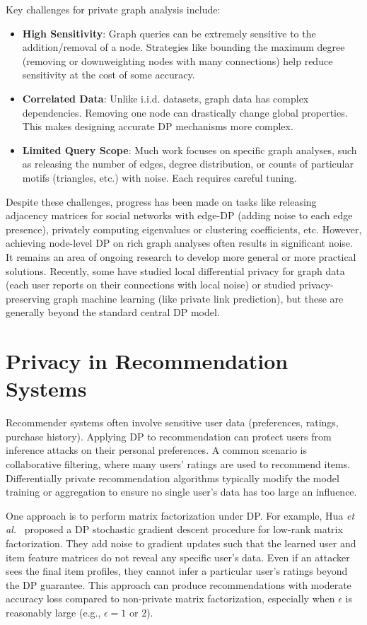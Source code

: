 \documentclass[11pt]{article}
\theoremstyle{remark}
\theoremstyle{definition}
\theoremstyle{plain}
\begin{document}
Key challenges for private graph analysis include:
\begin{itemize}
    \item \textbf{High Sensitivity}: Graph queries can be extremely sensitive to the addition/removal of a node. Strategies like bounding the maximum degree (removing or downweighting nodes with many connections) help reduce sensitivity at the cost of some accuracy.
    \item \textbf{Correlated Data}: Unlike i.i.d. datasets, graph data has complex dependencies. Removing one node can drastically change global properties. This makes designing accurate DP mechanisms more complex.
    \item \textbf{Limited Query Scope}: Much work focuses on specific graph analyses, such as releasing the number of edges, degree distribution, or counts of particular motifs (triangles, etc.) with noise. Each requires careful tuning.
\end{itemize}

Despite these challenges, progress has been made on tasks like releasing adjacency matrices for social networks with edge-DP (adding noise to each edge presence), privately computing eigenvalues or clustering coefficients, etc. However, achieving node-level DP on rich graph analyses often results in significant noise. It remains an area of ongoing research to develop more general or more practical solutions. Recently, some have studied local differential privacy for graph data (each user reports on their connections with local noise) or studied privacy-preserving graph machine learning (like private link prediction), but these are generally beyond the standard central DP model.

\section{Privacy in Recommendation Systems}

Recommender systems often involve sensitive user data (preferences, ratings, purchase history). Applying DP to recommendation can protect users from inference attacks on their personal preferences. A common scenario is collaborative filtering, where many users' ratings are used to recommend items. Differentially private recommendation algorithms typically modify the model training or aggregation to ensure no single user's data has too large an influence.

One approach is to perform matrix factorization under DP. For example, Hua \textit{et al.}~\cite{Hua2015} proposed a DP stochastic gradient descent procedure for low-rank matrix factorization. They add noise to gradient updates such that the learned user and item feature matrices do not reveal any specific user's data. Even if an attacker sees the final item profiles, they cannot infer a particular user's ratings beyond the DP guarantee. This approach can produce recommendations with moderate accuracy loss compared to non-private matrix factorization, especially when $\epsilon$ is reasonably large (e.g., $\epsilon=1$ or $2$).
\end{document}
